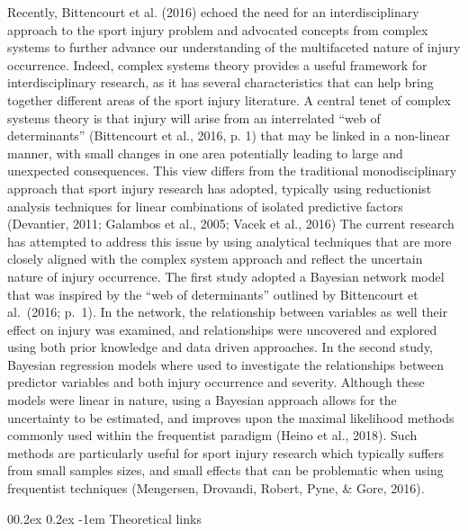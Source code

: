 \documentclass[
  english,
  man,floatsintext]{apa6}
\makeatletter
\renewcommand{\paragraph}{\@startsection{paragraph}{4}{\parindent}%
  {0\baselineskip \@plus 0.2ex \@minus 0.2ex}%
  {-1em}%
  {\normalfont\normalsize\bfseries\itshape\typesectitle}}
\makeatother
\begin{document}
Recently, Bittencourt et al. (2016) echoed the need for an interdisciplinary approach to the sport injury problem and advocated concepts from complex systems to further advance our understanding of the multifaceted nature of injury occurrence.
Indeed, complex systems theory provides a useful framework for interdisciplinary research, as it has several characteristics that can help bring together different areas of the sport injury literature.
A central tenet of complex systems theory is that injury will arise from an interrelated \enquote{web of determinants} (Bittencourt et al., 2016, p. 1) that may be linked in a non-linear manner, with small changes in one area potentially leading to large and unexpected consequences.
This view differs from the traditional monodisciplinary approach that sport injury research has adopted, typically using reductionist analysis techniques for linear combinations of isolated predictive factors (Devantier, 2011; Galambos et al., 2005; Vacek et al., 2016)
The current research has attempted to address this issue by using analytical techniques that are more closely aligned with the complex system approach and reflect the uncertain nature of injury occurrence.
The first study adopted a Bayesian network model that was inspired by the \enquote{web of determinants} outlined by Bittencourt et al.~(2016; p.~1).
In the network, the relationship between variables as well their effect on injury was examined, and relationships were uncovered and explored using both prior knowledge and data driven approaches.
In the second study, Bayesian regression models where used to investigate the relationships between predictor variables and both injury occurrence and severity.
Although these models were linear in nature, using a Bayesian approach allows for the uncertainty to be estimated, and improves upon the maximal likelihood methods commonly used within the frequentist paradigm (Heino et al., 2018).
Such methods are particularly useful for sport injury research which typically suffers from small samples sizes, and small effects that can be problematic when using frequentist techniques (Mengersen, Drovandi, Robert, Pyne, \& Gore, 2016).

\hypertarget{theoretical-links}{%
\paragraph{Theoretical links}\label{theoretical-links}}
\end{document}
